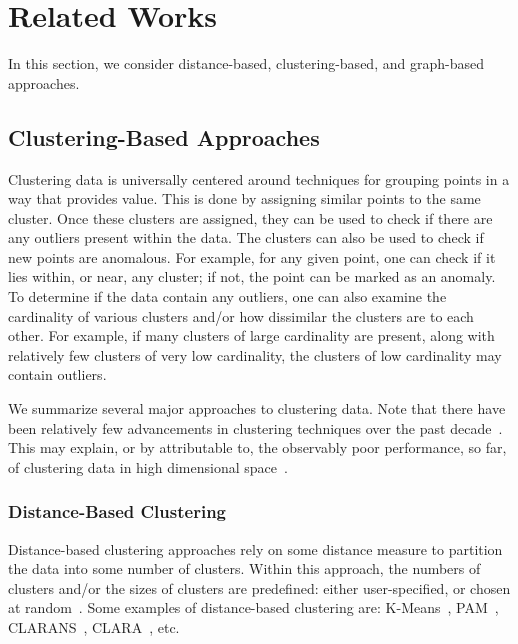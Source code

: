 \section{Related Works}
\label{sec:realted_works}

In this section, we consider distance-based, clustering-based, and graph-based approaches.

\subsection{Clustering-Based Approaches}

Clustering data is universally centered around techniques for grouping points in a way that provides value.
This is done by assigning similar points to the same cluster.
Once these clusters are assigned, they can be used to check if there are any outliers present within the data.
The clusters can also be used to check if new points are anomalous.
For example, for any given point, one can check if it lies within, or near, any cluster; if not, the point can be marked as an anomaly.
To determine if the data contain any outliers, one can also examine the cardinality of various clusters and/or how dissimilar the clusters are to each other.
For example, if many clusters of large cardinality are present, along with relatively few clusters of very low cardinality, the clusters of low cardinality may contain outliers.

We summarize several major approaches to clustering data.
Note that there have been relatively few advancements in clustering techniques over the past decade~\cite{wang_progress_2019}. This may explain, or by attributable to, the observably poor performance, so far, of clustering data in high dimensional space~\cite{zhang_advancements_2013}.

\subsubsection{Distance-Based Clustering}

Distance-based clustering approaches rely on some distance measure to partition the data into some number of clusters.
Within this approach, the numbers of clusters and/or the sizes of clusters are predefined: either user-specified, or chosen at random~\cite{wang_progress_2019}.
Some examples of distance-based clustering are: 
K-Means~\cite{macqueen_methods_nodate}, 
PAM~\cite{kaufman_finding_nodate}, 
CLARANS~\cite{ng_efficient_nodate}, 
CLARA~\cite{kaufman_finding_nodate}, 
etc.

